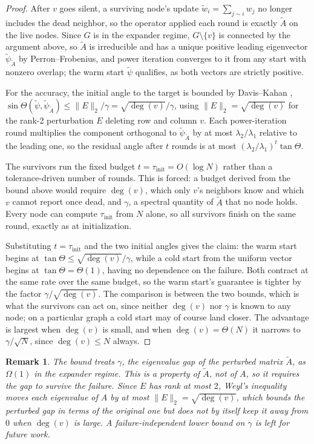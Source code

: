 \documentclass[letterpaper]{article} %
\newtheorem{remark}{Remark}
\begin{document}
\begin{proof}
After $v$ goes silent, a surviving node's update
$\tilde w_i = \sum_{j\sim i} w_j$ no longer includes the dead neighbor, so the
operator applied each round is exactly $\tilde A$ on the live nodes. Since $G$ is
in the expander regime, $G\setminus\{v\}$ is connected by the argument above, so
$\tilde A$ is irreducible and has
a unique positive leading eigenvector $\tilde\psi_{\tilde A}$ by
Perron--Frobenius, and power iteration converges to it from any start with
nonzero overlap; the warm start $\tilde\psi$ qualifies, as both vectors are
strictly positive.

For the accuracy, the initial angle to the target is bounded by Davis--Kahan
\citep{daviskahan1970},
$\sin\Theta(\tilde\psi,\tilde\psi_{\tilde A}) \leq \|E\|_2/\gamma
= \sqrt{\deg(v)}/\gamma$, using $\|E\|_2 = \sqrt{\deg(v)}$ for the rank-2
perturbation $E$ deleting row and column $v$. Each power-iteration round
multiplies the component orthogonal to $\tilde\psi_{\tilde A}$ by at most
$\lambda_2/\lambda_1$ relative to the leading one, so the residual angle after
$t$ rounds is at most $(\lambda_2/\lambda_1)^t\tan\Theta$.

The survivors run the fixed budget $t = \tau_{\mathrm{init}} = O(\log N)$
rather than a tolerance-driven number of rounds. This is forced: a budget
derived from the bound above would require $\deg(v)$, which only $v$'s
neighbors know and which $v$ cannot report once dead, and $\gamma$, a spectral
quantity of $\tilde A$ that no node holds. Every node can compute
$\tau_{\mathrm{init}}$ from $N$ alone, so all survivors finish on the same
round, exactly as at initialization.

Substituting $t = \tau_{\mathrm{init}}$ and the two initial angles gives the
claim: the warm start begins at $\tan\Theta \leq \sqrt{\deg(v)}/\gamma$, while
a cold start from the uniform vector begins at $\tan\Theta = \Theta(1)$, having
no dependence on the failure. Both contract at the same rate over the same
budget, so the warm start's guarantee is tighter by the factor
$\gamma/\sqrt{\deg(v)}$. The comparison is between the two bounds, which is
what the survivors can act on, since neither $\deg(v)$ nor $\gamma$ is known
to any node; on a particular graph a cold start may of course land closer. The
advantage is largest when $\deg(v)$ is small, and when $\deg(v) = \Theta(N)$
it narrows to $\gamma/\sqrt{N}$, since $\deg(v) \leq N$ always.
\end{proof}

\begin{remark}
\label{rem:gamma}
The bound treats $\gamma$, the eigenvalue gap of the \emph{perturbed} matrix
$\tilde A$, as $\Omega(1)$ in the expander regime. This is a property of
$\tilde A$, not of $A$, so it requires the gap to survive the failure. Since
$E$ has rank at most $2$, Weyl's inequality moves each eigenvalue of $A$ by at
most $\|E\|_2 = \sqrt{\deg(v)}$, which bounds the perturbed gap in terms of the
original one but does not by itself keep it away from $0$ when $\deg(v)$ is
large. A failure-independent lower bound on $\gamma$ is left for future work.
\end{remark}
\end{document}
